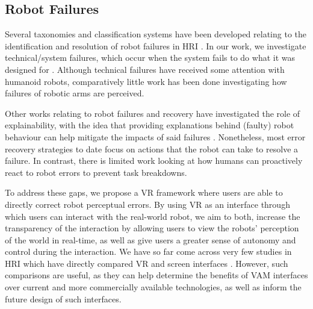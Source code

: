 \documentclass[letterpaper, 10 pt, conference]{ieeeconf}  %
\begin{document}


\subsection{Robot Failures}
Several taxonomies and classification systems have been developed relating to the identification and resolution of robot failures in HRI \cite{tolmeijer2020taxonomy, brooks2016analysis}. In our work, we investigate technical/system failures, which occur when the system fails to do what it was designed for \cite{tolmeijer2020taxonomy}.  Although technical failures have received some attention with humanoid robots, comparatively little work has been done investigating how failures of robotic arms are perceived.

Other works relating to robot failures and recovery have investigated the role of explainability, with the idea that providing explanations behind (faulty) robot behaviour can help mitigate the impacts of said failures \cite{esterwood2022literature}. Nonetheless, most error recovery strategies to date focus on actions that the robot can take to resolve a failure. In contrast, there is limited work looking at how humans can proactively react to robot errors to prevent task breakdowns. 

To address these gaps, we propose a VR framework where users are able to directly correct robot perceptual errors. By using VR as an interface through which users can interact with the real-world robot, we aim to both, increase the transparency of the interaction by allowing users to view the robots' perception of the world in real-time, as well as give users a greater sense of autonomy and control during the interaction. We have so far come across very few studies in HRI which have directly compared VR and screen interfaces \cite{mara2021user}. However, such comparisons are useful, as they can help determine the benefits of VAM interfaces over current and more commercially available technologies, as well as inform the future design of such interfaces. 


\end{document}
